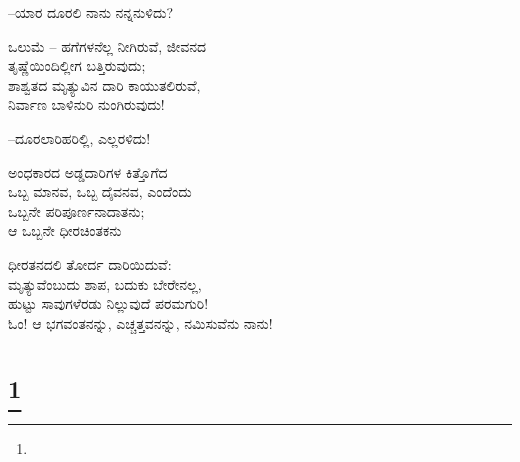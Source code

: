 \begin{flushright}
–ಯಾರ ದೂರಲಿ ನಾನು ನನ್ನನುಳಿದು?
\end{flushright}

\begin{myquote}
ಒಲುಮೆ – ಹಗೆಗಳನೆಲ್ಲ ನೀಗಿರುವೆ, ಜೀವನದ\\ತೃಷ್ಣೆಯಿಂದಿಲ್ಲೀಗ ಬತ್ತಿರುವುದು;\\ಶಾಶ್ವತದ ಮೃತ್ಯುವಿನ ದಾರಿ ಕಾಯುತಲಿರುವೆ,\\ನಿರ್ವಾಣ ಬಾಳಿನುರಿ ನುಂಗಿರುವುದು!
\end{myquote}

\begin{flushright}
–ದೂರಲಾರಿಹರಿಲ್ಲಿ, ಎಲ್ಲರಳಿದು!
\end{flushright}

\begin{myquote}
ಅಂಧಕಾರದ ಅಡ್ಡದಾರಿಗಳ ಕಿತ್ತೊಗೆದ\\ಒಬ್ಬ ಮಾನವ, ಒಬ್ಬ ದೈವನವ, ಎಂದೆಂದು\\ಒಬ್ಬನೇ ಪರಿಪೂರ್ಣನಾದಾತನು;\\ಆ ಒಬ್ಬನೇ ಧೀರಚಿಂತಕನು
\end{myquote}

\begin{myquote}
ಧೀರತನದಲಿ ತೋರ್ದ ದಾರಿಯಿದುವೆ:\\ಮೃತ್ಯುವೆಂಬುದು ಶಾಪ, ಬದುಕು ಬೇರೇನಲ್ಲ,\\ಹುಟ್ಟು ಸಾವುಗಳೆರಡು ನಿಲ್ಲುವುದೆ ಪರಮಗುರಿ!\\ಓಂ! ಆ ಭಗವಂತನನ್ನು, ಎಚ್ಚತ್ತವನನ್ನು, ನಮಿಸುವೆನು ನಾನು!
\end{myquote}

\selecteng

\chapter[KALI THE MOTHER]{\protect\footnote{}}

